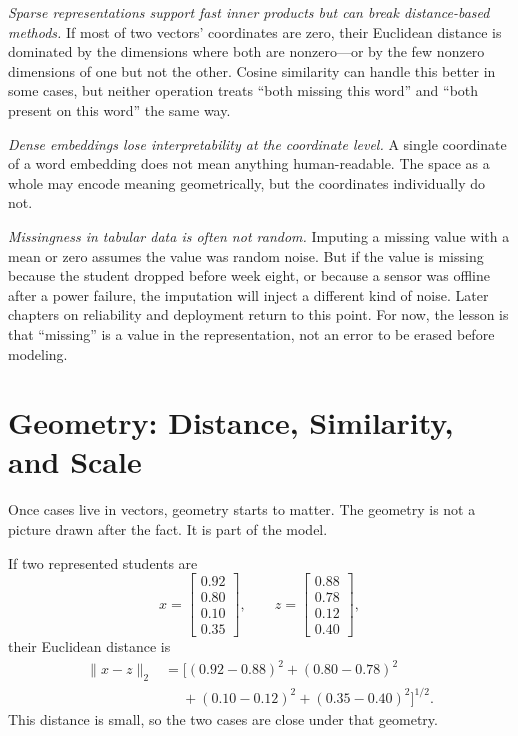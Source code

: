 \emph{Sparse representations support fast inner products but can break distance-based methods.} If most of two vectors' coordinates are zero, their Euclidean distance is dominated by the dimensions where both are nonzero---or by the few nonzero dimensions of one but not the other. Cosine similarity can handle this better in some cases, but neither operation treats ``both missing this word'' and ``both present on this word'' the same way.

\emph{Dense embeddings lose interpretability at the coordinate level.} A single coordinate of a word embedding does not mean anything human-readable. The space as a whole may encode meaning geometrically, but the coordinates individually do not.

\emph{Missingness in tabular data is often not random.} Imputing a missing value with a mean or zero assumes the value was random noise. But if the value is missing because the student dropped before week eight, or because a sensor was offline after a power failure, the imputation will inject a different kind of noise. Later chapters on reliability and deployment return to this point. For now, the lesson is that ``missing'' is a value in the representation, not an error to be erased before modeling.

\section*{Geometry: Distance, Similarity, and Scale}

Once cases live in vectors, geometry starts to matter. The geometry is not a picture drawn after the fact. It is part of the model.

If two represented students are
\[
x =
\begin{bmatrix}
0.92 \\
0.80 \\
0.10 \\
0.35
\end{bmatrix},
\qquad
z =
\begin{bmatrix}
0.88 \\
0.78 \\
0.12 \\
0.40
\end{bmatrix},
\]
their Euclidean distance is
\begin{align*}
\|x-z\|_2 &= \bigl[(0.92{-}0.88)^2 + (0.80{-}0.78)^2 \\
&\quad\;+ (0.10{-}0.12)^2 + (0.35{-}0.40)^2\bigr]^{1/2}.
\end{align*}
This distance is small, so the two cases are close under that geometry.

